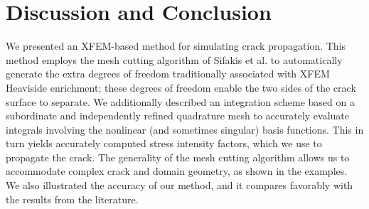 \section{Discussion and Conclusion}

We presented an XFEM-based method for simulating crack propagation. This method employs the mesh cutting algorithm of Sifakis et al. \cite{Sifakis07} to automatically generate the extra degrees of freedom traditionally associated with XFEM Heaviside enrichment; these degrees of freedom enable the two sides of the crack surface to separate. We additionally described an integration scheme based on a subordinate and independently refined quadrature mesh to accurately evaluate integrals involving the nonlinear (and sometimes singular) basis functions. This in turn yields accurately computed stress intensity factors, which we use to propagate the crack. The generality of the mesh cutting algorithm allows us to accommodate complex crack and domain geometry, as shown in the examples. We also illustrated the accuracy of our method, and it compares favorably with the results from the literature.
